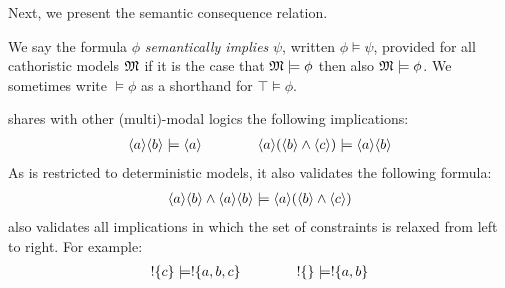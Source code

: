
\NI Next, we present the semantic consequence relation.
\begin{definition} 
 We say the formula $\phi$ \emph{semantically implies} $\psi$, written $\phi
   \models \psi$, provided for all cathoristic models $\frak{M}$ if it is the
   case that $\frak{M} \models \phi$ then also $\frak{M} \models \phi$.
   We sometimes write $\models \phi$ as a shorthand for $\top \models \phi$.
\end{definition}

\begin{example}
\Cathoristic{} shares with other (multi)-modal logics the following
implications:
\begin{eqnarray*}
\langle a \rangle \langle b \rangle \models \langle a \rangle \qquad\qquad
\langle a \rangle (\langle b \rangle \land \langle c \rangle ) \models \langle a \rangle \langle b \rangle \end{eqnarray*}
As \cathoristic{} is restricted to deterministic models, it also
validates the following formula:
\begin{eqnarray*}
\langle a \rangle \langle b \rangle \land \langle a \rangle \langle b \rangle \models \langle a \rangle (\langle b \rangle \land \langle c \rangle )
\end{eqnarray*}
\Cathoristic{} also validates all implications in which the set of constraints is relaxed from left to right. For example:
\begin{eqnarray*}
! \{c\} \models ! \{a, b, c\} 
 \qquad\qquad
! \{\} \models ! \{a, b\} 
\end{eqnarray*}
\end{example}
